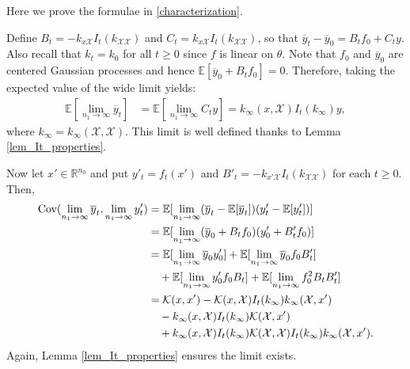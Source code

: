 \documentclass{article}
\theoremstyle{definition}
\theoremstyle{remark}
\numberwithin{equation}{section}
\newcommand{\X}{\mathcal{X}}
\newcommand{\R}{\mathbb{R}}
\newcommand{\E}{\mathbb{E}}
\newcommand{\ktest}{k_{x\X}}
\newcommand{\ktrain}{k_{\X\X}}
\begin{document}
    Here we prove the formulae in \eqref{characterization}.

    Define $B_t = -\ktest I_t(\ktrain)$ and $C_t = \ktest I_t(\ktrain)$, so that $\overline y_t-\overline y_0 = B_tf_0 + C_ty$.
    Also recall that $k_t=k_0$ for all $t\ge 0$ since $f$ is linear on $\theta$.
    Note that $f_0$ and $\overline y_0$ are centered Gaussian processes and hence $\E[\overline y_0+B_tf_0] = 0$.
    Therefore, taking the expected value of the wide limit yields:
    \begin{align}
        \E[\lim_{n_1 \to \infty}\overline y_t] &= \E[\lim_{n_1 \to \infty}C_t y] = k_\infty(x,\X)I_t(k_\infty)y,
    \end{align}
    where $k_\infty = k_\infty(\X,\X)$.
    This limit is well defined thanks to Lemma \ref{lem_It_properties}.
    
    Now let $x'\in \R^{n_0}$ and put $y'_t=f_t(x')$ and $B'_t = -k_{x'\X}I_t(\ktrain)$ for each $t\ge 0$.
    Then,
    \begin{align}
        \textup{Cov}(\lim_{n_1 \to \infty}\overline y_t,\lim_{n_1 \to \infty}y_t')&= \E[\lim_{n_1 \to \infty}(\overline y_t - \E[\overline y_t])(y'_t - \E[y'_t]) ] \\
        &= \E[\lim_{n_1 \to \infty}(\overline y_0 + B_tf_0)(y'_0 + B'_tf_0) ] \\
        &= \E[\lim_{n_1 \to \infty}\overline y_0y'_0 ] + \E[\lim_{n_1  \to \infty} \overline y_0f_0 B'_t]  \\
        &\quad +\E[\lim_{n_1  \to \infty} y'_0f_0B_t  ]+ \E[\lim_{n_1 \to \infty}f_0^2B_tB'_t] \\
        &=\mathcal K(x,x') - \mathcal K(x,\X)I_t(k_\infty)k_\infty(\X,x')\\
        &\quad- k_\infty(x,\X)I_t(k_\infty)\mathcal K(\X,x')\\
        &\quad + k_\infty(x,\X)I_t(k_\infty)\mathcal K(\X,\X)I_t(k_\infty)k_\infty(\X,x').
    \end{align}
    Again, Lemma \ref{lem_It_properties} ensures the limit exists.
\end{document}
